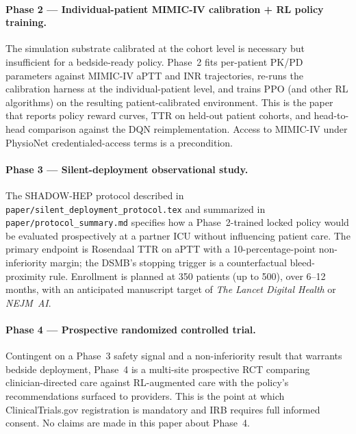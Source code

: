 \documentclass[11pt]{article}
\begin{document}
\paragraph{Phase 2 --- Individual-patient MIMIC-IV calibration + RL policy training.}
The simulation substrate calibrated at the cohort level is necessary but insufficient for a bedside-ready policy. Phase~2 fits per-patient PK/PD parameters against MIMIC-IV \citep{johnson2023mimic4} aPTT and INR trajectories, re-runs the calibration harness at the individual-patient level, and trains PPO (and other RL algorithms) on the resulting patient-calibrated environment. This is the paper that reports policy reward curves, TTR on held-out patient cohorts, and head-to-head comparison against the \citet{nemati2016} DQN reimplementation. Access to MIMIC-IV under PhysioNet credentialed-access terms is a precondition.

\paragraph{Phase 3 --- Silent-deployment observational study.}
The SHADOW-HEP protocol described in \texttt{paper/silent\_deployment\_protocol.tex} and summarized in \texttt{paper/protocol\_summary.md} specifies how a Phase~2-trained locked policy would be evaluated prospectively at a partner ICU without influencing patient care. The primary endpoint is Rosendaal TTR on aPTT with a 10-percentage-point non-inferiority margin; the DSMB's stopping trigger is a counterfactual bleed-proximity rule. Enrollment is planned at 350 patients (up to 500), over 6--12 months, with an anticipated manuscript target of \emph{The Lancet Digital Health} or \emph{NEJM~AI}.

\paragraph{Phase 4 --- Prospective randomized controlled trial.}
Contingent on a Phase~3 safety signal and a non-inferiority result that warrants bedside deployment, Phase~4 is a multi-site prospective RCT comparing clinician-directed care against RL-augmented care with the policy's recommendations surfaced to providers. This is the point at which ClinicalTrials.gov registration is mandatory and IRB requires full informed consent. No claims are made in this paper about Phase~4.
\end{document}
